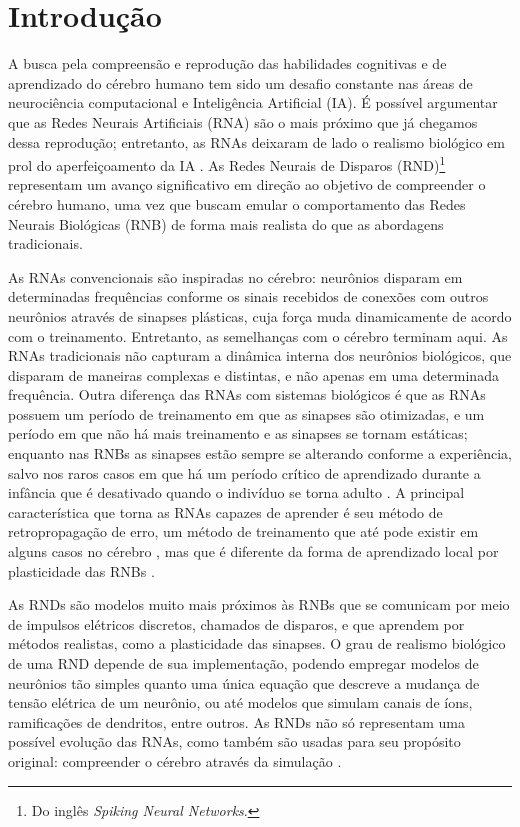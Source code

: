 \chapter{Introdução}

A busca pela compreensão e reprodução das habilidades cognitivas e de aprendizado do cérebro humano tem sido um desafio constante
nas áreas de neurociência computacional e Inteligência Artificial (IA). É possível argumentar que as Redes Neurais Artificiais
(RNA) são o mais próximo que já chegamos dessa reprodução; entretanto, as RNAs deixaram de lado o realismo biológico em prol do
aperfeiçoamento da IA \cite{yamazakiSpiking2022}. As Redes Neurais de Disparos (RND)\footnote{Do inglês \textit{Spiking Neural
Networks}.} representam um avanço significativo em direção ao objetivo de compreender o cérebro humano, uma vez que buscam emular
o comportamento das Redes Neurais Biológicas (RNB) de forma mais realista do que as abordagens tradicionais.

As RNAs convencionais são inspiradas no cérebro: neurônios disparam em determinadas frequências conforme os sinais recebidos de
conexões com outros neurônios através de sinapses plásticas, cuja força muda dinamicamente de acordo com o treinamento.
Entretanto, as semelhanças com o cérebro terminam aqui. As RNAs tradicionais não capturam a dinâmica interna dos neurônios
biológicos, que disparam de maneiras complexas e distintas, e não apenas em uma determinada frequência. Outra diferença das RNAs
com sistemas biológicos é que as RNAs possuem um período de treinamento em que as sinapses são otimizadas, e um período em que não
há mais treinamento e as sinapses se tornam estáticas; enquanto nas RNBs as sinapses estão sempre se alterando conforme a
experiência, salvo nos raros casos em que há um período crítico de aprendizado durante a infância que é desativado quando o
indivíduo se torna adulto \cite{crepelRegression1982}. A principal característica que torna as RNAs capazes de aprender é seu
método de retropropagação de erro, um método de treinamento que até pode existir em alguns casos no cérebro
\cite{lillicrapBackpropagation2020,songCan2020}, mas que é diferente da forma de aprendizado local por plasticidade das
RNBs \cite{yamazakiSpiking2022}.

As RNDs são modelos muito mais próximos às RNBs que se comunicam por meio de impulsos elétricos discretos, chamados de disparos, e
que aprendem por métodos realistas, como a plasticidade das sinapses. O grau de realismo biológico de uma RND depende de sua
implementação, podendo empregar modelos de neurônios tão simples quanto uma única equação que descreve a mudança de tensão
elétrica de um neurônio\cite{burkitt2006review}, ou até modelos que simulam canais de íons\cite{hodgkinQuantitative1952},
ramificações de dendritos\cite{pagkalosIntroducing2023}, entre outros. As RNDs não só representam uma possível evolução das RNAs,
como também são usadas para seu propósito original: compreender o cérebro através da simulação \cite{}.

